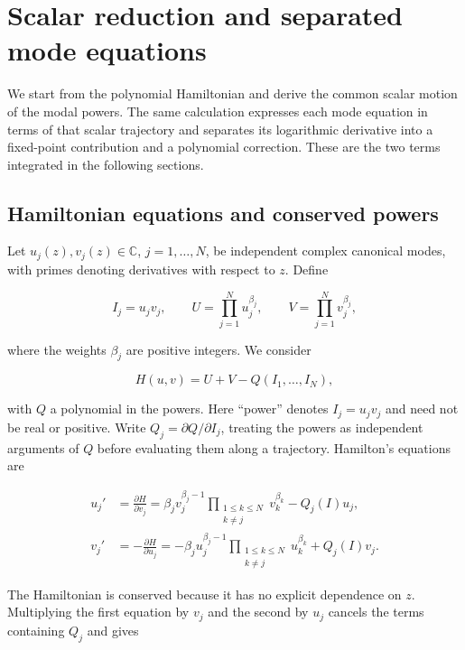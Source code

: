 \documentclass[11pt]{article}
\begin{document}
\section{Scalar reduction and separated mode equations}\label{sec:setup}

We start from the polynomial Hamiltonian and derive the common scalar motion of the modal powers. The same calculation expresses each mode equation in terms of that scalar trajectory and separates its logarithmic derivative into a fixed-point contribution and a polynomial correction. These are the two terms integrated in the following sections.

\subsection{Hamiltonian equations and conserved powers}

Let $u_j(z),v_j(z)\in\mathbb C$, $j=1,\ldots,N$, be independent complex canonical modes, with primes denoting derivatives with respect to $z$. Define

\[
I_j=u_jv_j,\qquad
U=\prod_{j=1}^N u_j^{\beta_j},\qquad
V=\prod_{j=1}^N v_j^{\beta_j},
\]

where the weights $\beta_j$ are positive integers. We consider

\begin{equation}\label{eq:hamiltonian}
H(u,v)=U+V-Q(I_1,\ldots,I_N),
\end{equation}

with $Q$ a polynomial in the powers. Here ``power'' denotes $I_j=u_jv_j$ and need not be real or positive. Write $Q_j=\partial Q/\partial I_j$, treating the powers as independent arguments of $Q$ before evaluating them along a trajectory. Hamilton's equations are

\begin{equation}\label{eq:canonical}
\begin{aligned}
u_j'&=\frac{\partial H}{\partial v_j}
=\beta_jv_j^{\beta_j-1}\prod_{\substack{1\le k\le N\\k\ne j}}v_k^{\beta_k}-Q_j(I)u_j,\\
v_j'&=-\frac{\partial H}{\partial u_j}
=-\beta_ju_j^{\beta_j-1}\prod_{\substack{1\le k\le N\\k\ne j}}u_k^{\beta_k}+Q_j(I)v_j.
\end{aligned}
\end{equation}

The Hamiltonian is conserved because it has no explicit dependence on $z$. Multiplying the first equation by $v_j$ and the second by $u_j$ cancels the terms containing $Q_j$ and gives
\end{document}
